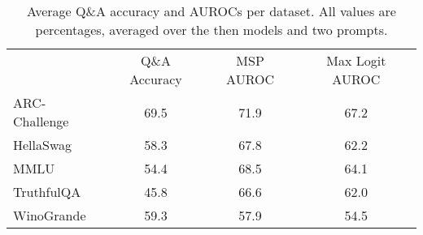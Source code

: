 \begin{table*}[tb]
\centering
\caption{Average Q\&A accuracy and AUROCs per dataset. All values are percentages, averaged over the then models and two prompts.}
\label{tab:dataset}
\vspace{-.1 in}
\begin{tabular}{lccc}
\toprule
 & Q\&A Accuracy & MSP AUROC & Max Logit AUROC \\ 
\cmidrule(lr){1-1} \cmidrule(lr){2-2} \cmidrule(lr){3-3} \cmidrule(lr){4-4}
ARC-Challenge & 69.5 & 71.9 & 67.2\\
HellaSwag & 58.3 & 67.8 & 62.2\\
MMLU & 54.4 & 68.5 & 64.1\\
TruthfulQA & 45.8 & 66.6 & 62.0\\
WinoGrande & 59.3 & 57.9 & 54.5\\
\bottomrule
\end{tabular}
\end{table*}
